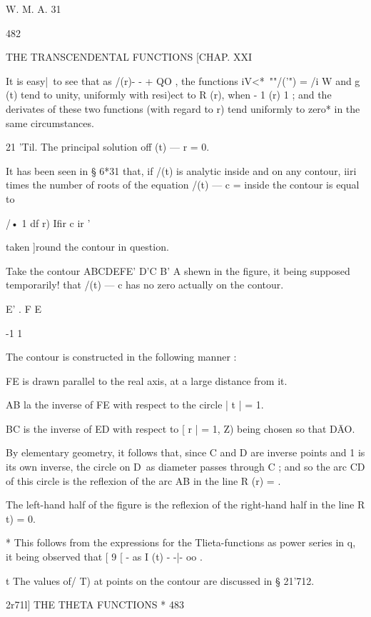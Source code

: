 W. M. A. 31



482



THE TRANSCENDENTAL FUNCTIONS [CHAP. XXI



It is easy|\ to see that as /(r)- - + QO , the functions iV<*~""/('")
= /i W and g (t) tend to unity, uniformly with resi)ect to R (r), when
- 1 (r) 1 ; and the derivates of these two functions (with regard to
r) tend uniformly to zero* in the same circumstances.

21 'Til. The principal solution off (t) — r = 0.

It has been seen in § 6*31 that, if /(t) is analytic inside and on any
contour, iiri times the number of roots of the equation /(t) — c =
inside the contour is equal to

/• 1 df r) Ifir c ir '

taken ]round the contour in question.

Take the contour ABCDEFE' D'C B' A shewn in the figure, it being
supposed temporarily! that /(t) — c has no zero actually on the
contour.

E' . F E




-1 1

The contour is constructed in the following manner :

FE is drawn parallel to the real axis, at a large distance from it.

AB la the inverse of FE with respect to the circle | t | = 1.

BC is the inverse of ED with respect to [ r | = 1, Z) being chosen so
that D\=AO.

By elementary geometry, it follows that, since C and D are inverse
points and 1 is its own inverse, the circle on D\ as diameter passes
through C ; and so the arc CD of this circle is the reflexion of the
arc AB in the line R (r) = .

The left-hand half of the figure is the reflexion of the right-hand
half in the line R t) = 0.

* This follows from the expressions for the Tlieta-functions as power
series in q, it being observed that [ 9 [ - as I (t) - -|- oo .

t The values of/ T) at points on the contour are discussed in §
21'712.



2r71l] THE THETA FUNCTIONS * 483

